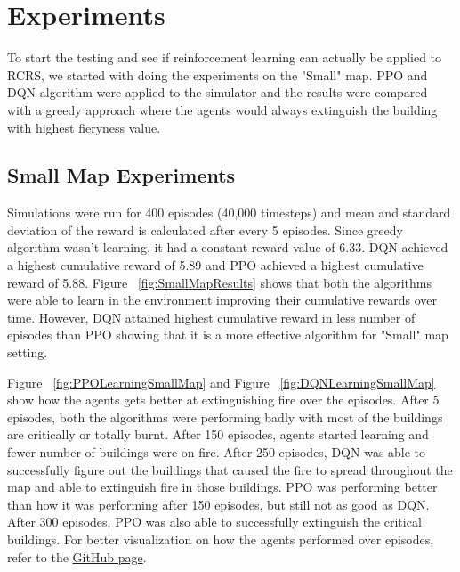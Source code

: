 \documentclass[12pt]{report}
\begin{document}
\section{Experiments} \label{Experiments}

To start the testing and see if reinforcement learning can actually be applied to RCRS, we started with doing the experiments on the "Small" map. PPO and DQN algorithm were applied to the simulator and the results were compared with a greedy approach where the agents would always extinguish the building with highest fieryness value. 

\subsection{Small Map Experiments}

Simulations were run for 400 episodes (40,000 timesteps) and mean and standard deviation of the reward is calculated after every 5 episodes. Since greedy algorithm wasn't learning, it had a constant reward value of 6.33. DQN achieved a highest cumulative reward of 5.89 and PPO achieved a highest cumulative reward of 5.88. Figure ~\ref{fig:SmallMapResults} shows that both the algorithms were able to learn in the environment improving their cumulative rewards over time. However, DQN attained highest cumulative reward in less number of episodes than PPO showing that it is a more effective algorithm for "Small" map setting.  

Figure ~\ref{fig:PPOLearningSmallMap} and Figure ~\ref{fig:DQNLearningSmallMap} show how the agents gets better at extinguishing fire over the episodes. After 5 episodes, both the algorithms were performing badly with most of the buildings are critically or totally burnt. After 150 episodes, agents started learning and fewer number of buildings were on fire. After 250 episodes, DQN was able to successfully figure out the buildings that caused the fire to spread throughout the map and able to extinguish fire in those buildings. PPO was performing better than how it was performing after 150 episodes, but still not as good as DQN. After 300 episodes, PPO was also able to successfully extinguish the critical buildings. For better visualization on how the agents performed over episodes, refer to the \href{https://github.com/animeshgoyal9/RoboCup_Rescue_Simulator_Gym_Integration} {GitHub page}. 
\end{document}
